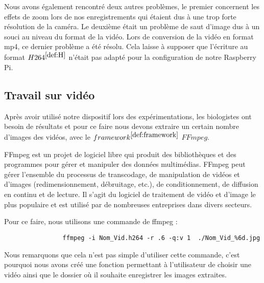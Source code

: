         Nous avons également rencontré deux autres problèmes, le premier concernent les effets de zoom lors de nos enregistrements qui étaient dus à une trop forte résolution de la caméra. Le deuxième était un problème de saut d'image dus à un souci au niveau du format de la vidéo.
        Lors de conversion de la vidéo en format mp4, ce dernier problème a été résolu.
        Cela laisse à supposer que l'écriture au format \underline{$H264^{\ref{def:H}}$} n'était pas adapté pour la configuration de notre Raspberry Pi.

        \subsection{Travail sur vidéo}
        Après avoir utilisé notre dispositif lors des expérimentations, les biologistes ont besoin de résultats et pour ce faire nous devons extraire un certain nombre d'images des vidéos, avec le  \underline{$framework^{\ref{def:framework}}$} \textbf{$FFmpeg$}.

        \vspace{0.2cm}

        FFmpeg est un projet de logiciel libre qui produit des bibliothèques et des programmes pour gérer et manipuler des données multimédias. FFmpeg peut gérer l'ensemble du processus de transcodage, de manipulation de vidéos et d'images (redimensionnement, débruitage, etc.), de conditionnement, de diffusion en continu et de lecture. Il s'agit du logiciel de traitement de vidéo et d'image le plus populaire et est utilisé par de nombreuses entreprises dans divers secteurs.

        \begin{flushleft}
            Pour ce faire, nous utilisons une commande de ffmpeg :
        
            \begin{verbatim}
                ffmpeg -i Nom_Vid.h264 -r .6 -q:v 1  ./Nom_Vid_%6d.jpg
            \end{verbatim}            


        \end{flushleft}

        Nous remarquons que cela n'est pas simple d'utiliser cette commande, c'est pourquoi nous avons créé une fonction permettant à l'utilisateur de choisir une vidéo ainsi que le dossier où il souhaite enregistrer les images extraites. 
        
        \vspace{0.2cm}

